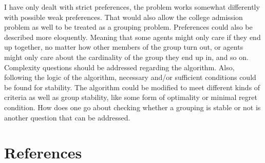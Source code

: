\documentclass{elsarticle}
\begin{document}
I have only dealt with strict preferences, the problem works somewhat differently with possible weak preferences. That would also allow the college admission problem as well to be treated as a grouping problem. Preferences could also be described more eloquently. Meaning that some agents might only care if they end up together, no matter how other members of the group turn out, or agents might only care about the cardinality of the group they end up in, and so on. Complexity questions should be addressed regarding the algorithm. Also, following the logic of the algorithm, necessary and/or sufficient conditions could be found for stability. The algorithm could be modified to meet different kinds of criteria as well as group stability, like some form of optimality or minimal regret condition. How does one go about checking whether a grouping is stable or not is another question that can be addressed.


\section*{References}


\end{document}
